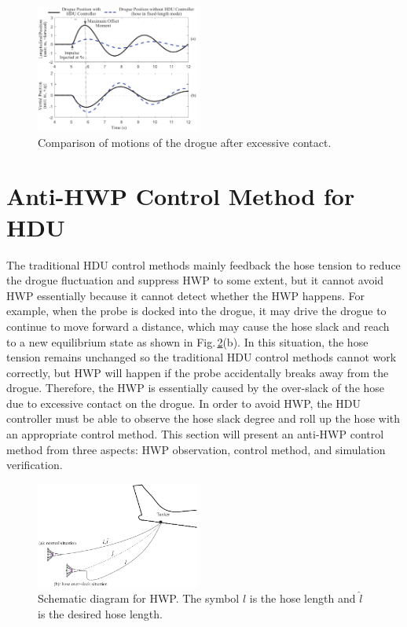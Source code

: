\begin{figure}[ptbh]
	\begin{centering}
		\includegraphics[width=0.48\textwidth]{Figures/Figs_Ch8/Fig14} 
		\par\end{centering}
	\caption{Comparison of motions of the drogue after excessive contact.}
	\label{F_Comparison_WAPE}
\end{figure}

\section{Anti-HWP Control Method for HDU}

The traditional HDU control methods mainly feedback the hose tension
to reduce the drogue fluctuation and suppress HWP to some extent,
but it cannot avoid HWP essentially because it cannot detect whether
the HWP happens. For example, when the probe is docked into the drogue,
it may drive the drogue to continue to move forward a distance, which
may cause the hose slack and reach to a new equilibrium state as shown
in Fig.\,\ref{F_Schematic}(b). In this situation, the hose tension
remains unchanged so the traditional HDU control methods cannot work
correctly, but HWP will happen if the probe accidentally breaks away
from the drogue. Therefore, the HWP is essentially caused by the over-slack
of the hose due to excessive contact on the drogue. In order to avoid
HWP, the HDU controller must be able to observe the hose slack degree
and roll up the hose with an appropriate control method. This section
will present an anti-HWP control method from three aspects: HWP observation,
control method, and simulation verification.

\begin{figure}[ptbh]
	\begin{centering}
		\includegraphics[width=0.48\textwidth]{Figures/Figs_Ch8/Fig15}
		\par\end{centering}
	\caption{Schematic diagram for HWP. The symbol $l$ is the hose length and
		$\hat{l}$ is the desired hose length.}
	\label{F_Schematic}
\end{figure}


